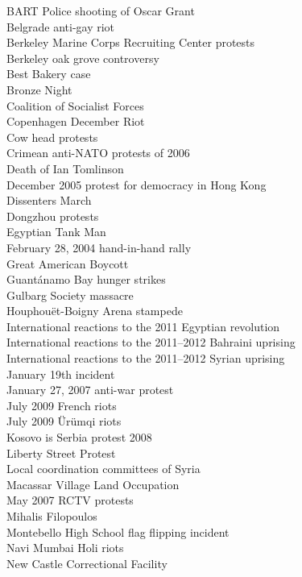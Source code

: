 BART Police shooting of Oscar Grant\\
Belgrade anti-gay riot\\
Berkeley Marine Corps Recruiting Center protests\\
Berkeley oak grove controversy\\
Best Bakery case\\
Bronze Night\\
Coalition of Socialist Forces\\
Copenhagen December Riot\\
Cow head protests\\
Crimean anti-NATO protests of 2006\\
Death of Ian Tomlinson\\
December 2005 protest for democracy in Hong Kong\\
Dissenters March\\
Dongzhou protests\\
Egyptian Tank Man\\
February 28, 2004 hand-in-hand rally\\
Great American Boycott\\
Guantánamo Bay hunger strikes\\
Gulbarg Society massacre\\
Houphouët-Boigny Arena stampede\\
International reactions to the 2011 Egyptian revolution\\
International reactions to the 2011–2012 Bahraini uprising\\
International reactions to the 2011–2012 Syrian uprising\\
January 19th incident\\
January 27, 2007 anti-war protest\\
July 2009 French riots\\
July 2009 Ürümqi riots\\
Kosovo is Serbia protest 2008\\
Liberty Street Protest\\
Local coordination committees of Syria\\
Macassar Village Land Occupation\\
May 2007 RCTV protests\\
Mihalis Filopoulos\\
Montebello High School flag flipping incident\\
Navi Mumbai Holi riots\\
New Castle Correctional Facility\\

